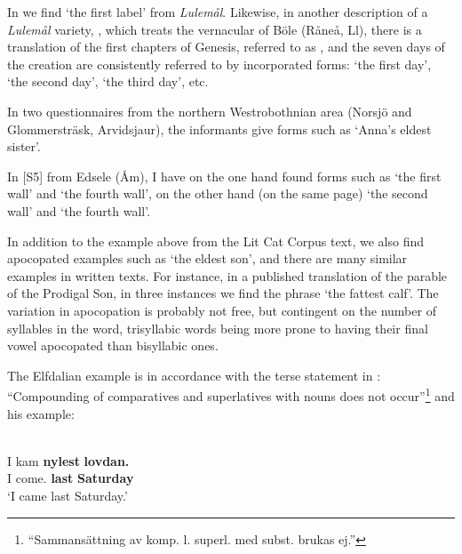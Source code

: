 In \citet[61]{Nordström1925} we find  ‘the first label’ from \textit{Lulemål}. Likewise, in another description of a \textit{Lulemål} variety, \citet{Wikberg2004}, which treats the vernacular of Böle (Råneå, Ll), there is a translation of the first chapters of Genesis, referred to as , and the seven days of the creation are consistently referred to by incorporated forms:  ‘the first day’,  ‘the second day’,  ‘the third day’, etc. 

In two questionnaires from the northern Westrobothnian area (Norsjö and Glommersträsk, Arvidsjaur), the informants give forms such as  ‘Anna’s eldest sister’.

In [S5] from Edsele (Åm), I have on the one hand found forms such as  ‘the first wall’ and ‘the fourth wall’, on the other hand (on the same page)  ‘the second wall’ and ‘the fourth wall’.

In addition to the example above from the Lit Cat Corpus text, we also find apocopated examples such as  ‘the eldest son’, and there are many similar examples in written texts. For instance, in a published translation of the parable of the Prodigal Son, in three instances we find the phrase  ‘the fattest calf’. The variation in apocopation is probably not free, but contingent on the number of syllables in the word, trisyllabic words being more prone to having their final vowel apocopated than bisyllabic ones. 

The Elfdalian example is in accordance with the terse statement in \citet[57]{Levander1909}: “Compounding of comparatives and superlatives with nouns does not occur”\footnote{ “Sammansättning av komp. l. superl. med subst. brukas ej.”} and his example:

\ea\label{}
\\
\gll I  kam  \textbf{nylest} \textbf{lovdan.}\\
I  come.{\pst}  \textbf{last} \textbf{Saturday}\\
\glt ‘I came last Saturday.’
\z

